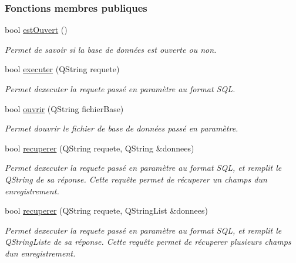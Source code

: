 \subsubsection*{Fonctions membres publiques}
\begin{DoxyCompactItemize}
\item 
bool \hyperlink{class_base_de_donnees_af9ac332082ffd0dd35e412cefabe5e9c}{est\+Ouvert} ()
\begin{DoxyCompactList}\small\item\em Permet de savoir si la base de données est ouverte ou non. \end{DoxyCompactList}\item 
bool \hyperlink{class_base_de_donnees_aa8de5f8f8bb17edc43f5c0ee33712081}{executer} (Q\+String requete)
\begin{DoxyCompactList}\small\item\em Permet d\textquotesingle{}executer la requete passé en paramètre au format S\+QL. \end{DoxyCompactList}\item 
bool \hyperlink{class_base_de_donnees_a7f6a5510b08017b0d99115a84252f186}{ouvrir} (Q\+String fichier\+Base)
\begin{DoxyCompactList}\small\item\em Permet d\textquotesingle{}ouvrir le fichier de base de données passé en paramètre. \end{DoxyCompactList}\item 
bool \hyperlink{class_base_de_donnees_a77539baad389f5acf754cd2cd452403e}{recuperer} (Q\+String requete, Q\+String \&donnees)
\begin{DoxyCompactList}\small\item\em Permet d\textquotesingle{}executer la requete passé en paramètre au format S\+QL, et remplit le Q\+String de sa réponse. Cette requête permet de récuperer un champs d\textquotesingle{}un enregistrement. \end{DoxyCompactList}\item 
bool \hyperlink{class_base_de_donnees_a2a5c461fa11d404810ae3ebe035d5190}{recuperer} (Q\+String requete, Q\+String\+List \&donnees)
\begin{DoxyCompactList}\small\item\em Permet d\textquotesingle{}executer la requete passé en paramètre au format S\+QL, et remplit le Q\+String\+Liste de sa réponse. Cette requête permet de récuperer plusieurs champs d\textquotesingle{}un enregistrement. \end{DoxyCompactList}\item 

\end{DoxyCompactItemize}
